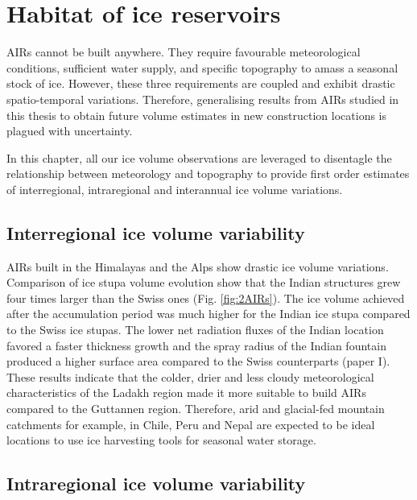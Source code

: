 \chapter{Habitat of ice reservoirs}


\ac{AIRs} cannot be built anywhere. They require favourable meteorological conditions, sufficient water supply,
and specific topography to amass a seasonal stock of ice. However, these three requirements are coupled and
exhibit drastic spatio-temporal variations. Therefore, generalising results from AIRs studied in this thesis to
obtain future volume estimates in new construction locations is plagued with uncertainty.

In this chapter, all our ice volume observations are leveraged to disentagle the relationship between meteorology
and topography to provide first order estimates of interregional, intraregional and interannual ice volume
variations. 

\section{Interregional ice volume variability}

\ac{AIRs} built in the Himalayas and the Alps show drastic ice volume variations. Comparison of ice stupa volume
evolution show that the Indian structures grew four times larger than the Swiss ones (Fig. \ref{fig:2AIRs}). The
ice volume achieved after the accumulation period was much higher for the Indian ice stupa compared to the Swiss
ice stupas. The lower net radiation fluxes of the Indian location favored a faster thickness growth and the
spray radius of the Indian fountain produced a higher surface area compared to the Swiss counterparts (paper I).
These results indicate that the colder, drier and less cloudy meteorological characteristics of the Ladakh
region made it more suitable to build \ac{AIRs} compared to the Guttannen region. Therefore, arid and
glacial-fed mountain catchments for example, in Chile, Peru and Nepal are expected to be ideal locations to use
ice harvesting tools for seasonal water storage.

\section{Intraregional ice volume variability}

